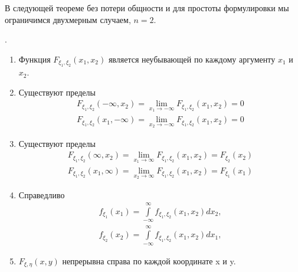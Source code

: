 В следующей теореме без потери общности и для простоты формулировки мы ограничимся двухмерным случаем, $n = 2$.

\begin{theorem}
\label{th:15.7}
.
\begin{enumerate}
	\item Функция $F_{\xi_1,\xi_2}(x_1,x_2)$ является неубывающей по каждому аргументу $x_1$ и $x_2$.

	\item Существуют пределы 
	\begin{gather*}
	F_{\xi_1,\xi_2}(-\infty,x_2)=\lim\limits_{x_1\to-\infty}
	F_{\xi_1,\xi_2}(x_1,x_2)=0 \\
	F_{\xi_1,\xi_2}(x_1,-\infty)=\lim\limits_{x_2\to-\infty}
	F_{\xi_1,\xi_2}(x_1,x_2)=0
	\end{gather*}

	\item Существуют пределы 
	\begin{gather*}
	F_{\xi_1,\xi_2}(\infty,x_2)=\lim\limits_{x_1\to\infty}
	F_{\xi_1,\xi_2}(x_1,x_2)=F_{\xi_2}(x_2) \\
	F_{\xi_1,\xi_2}(x_1,\infty)=\lim\limits_{x_2\to\infty}
	F_{\xi_1,\xi_2}(x_1,x_2)=F_{\xi_1}(x_1)
	\end{gather*}

	\item Справедливо
	\begin{gather*}
	f_{\xi_1}(x_1)=\int\limits_{-\infty}^{\infty}f_{\xi_1,\xi_2}(x_1,x_2)dx_2, \\
	f_{\xi_2}(x_2)=\int\limits_{-\infty}^{\infty}f_{\xi_1,\xi_2}(x_1,x_2)dx_1,
	\end{gather*}

	\item $F_{\xi,\eta}(x, y)$ непрерывна справа по каждой координате x и y.



\end{enumerate}

\end{theorem}


